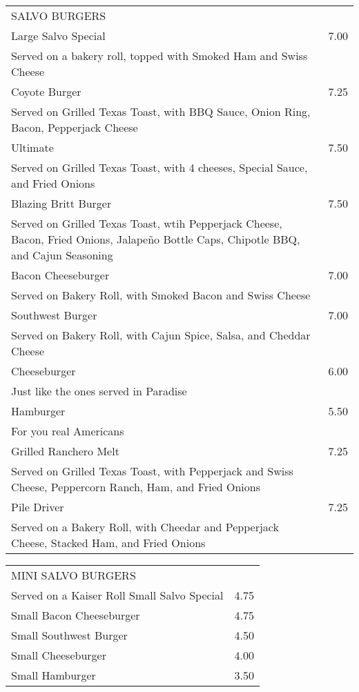 \documentclass[10pt,notitlepage]{article}
\makeatletter
\newcommand*\ColText[1]{\uppercase{#1}}
\newenvironment{Group}[1]
	{\noindent\begin{tabular*}{\textwidth}{@{}p{.8\linewidth}@{\extracolsep{\fill}}r@{}}
		{\centering\fontsize{16}{20}\selectfont\ColText{#1}}\\[0.8em]\par}
	{\end{tabular*}}
\newcommand*\Item[2]{%
	\sffamily#1\dotfill & #2}
\newcommand*\Desc[1]{%
	\hspace*{1em}\footnotesize #1}
\makeatother
\begin{document}
\thispagestyle{first}
	
	\begin{Group}{Salvo Burgers}
		\Item{Large Salvo Special}{7.00} \\
		\Desc{Served on a bakery roll, topped with Smoked Ham and Swiss Cheese} \\
		\Item{Coyote Burger}{7.25} \\
		\Desc{Served on Grilled Texas Toast, with BBQ Sauce, Onion Ring, Bacon, Pepperjack Cheese} \\
		\Item{Ultimate}{7.50} \\
		\Desc{Served on Grilled Texas Toast, with 4 cheeses, Special Sauce, and Fried Onions} \\
		\Item{Blazing Britt Burger}{7.50} \\
		\Desc{Served on Grilled Texas Toast, wtih Pepperjack Cheese, Bacon, Fried Onions, Jalape\~{n}o Bottle Caps, Chipotle BBQ, and Cajun Seasoning} \\
		\Item{Bacon Cheeseburger}{7.00} \\
		\Desc{Served on Bakery Roll, with Smoked Bacon and Swiss Cheese} \\
		\Item{Southwest Burger}{7.00} \\
		\Desc{Served on Bakery Roll, with Cajun Spice, Salsa, and Cheddar Cheese} \\
		\Item{Cheeseburger}{6.00} \\
		\Desc{Just like the ones served in Paradise} \\
		\Item{Hamburger}{5.50} \\
		\Desc{For you real Americans} \\
		\Item{Grilled Ranchero Melt}{7.25} \\
		\Desc{Served on Grilled Texas Toast, with Pepperjack and Swiss Cheese, Peppercorn Ranch, Ham, and Fried Onions} \\
		\Item{Pile Driver}{7.25} \\
		\Desc{Served on a Bakery Roll, with Cheedar and Pepperjack Cheese, Stacked Ham, and Fried Onions} \\
	\end{Group}
	
	\vfill{}
	
	\begin{Group}{Mini Salvo Burgers}
		Served on a Kaiser Roll
		\Item{Small Salvo Special}{4.75} \\
		\Item{Small Bacon Cheeseburger}{4.75} \\
		\Item{Small Southwest Burger}{4.50} \\
		\Item{Small Cheeseburger}{4.00} \\
		\Item{Small Hamburger}{3.50} \\
	\end{Group}
	
\end{document}

